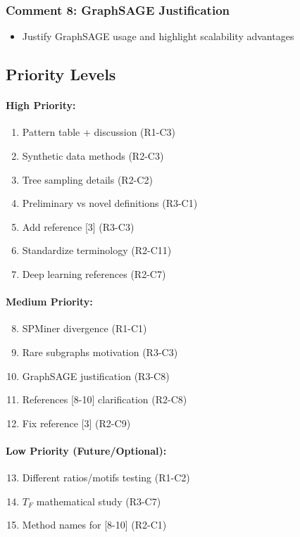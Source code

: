 \subsubsection*{Comment 8: GraphSAGE Justification}
\begin{itemize}
    \item[$\square$] Justify GraphSAGE usage and highlight scalability advantages
\end{itemize}

\subsection*{Priority Levels}

\paragraph{High Priority:}
\begin{enumerate}
    \item Pattern table + discussion (R1-C3)
    \item Synthetic data methods (R2-C3)
    \item Tree sampling details (R2-C2)
    \item Preliminary vs novel definitions (R3-C1)
    \item Add reference [3] (R3-C3)
    \item Standardize terminology (R2-C11)
    \item Deep learning references (R2-C7)
\end{enumerate}

\paragraph{Medium Priority:}
\begin{enumerate}
    \setcounter{enumi}{7}
    \item SPMiner divergence (R1-C1)
    \item Rare subgraphs motivation (R3-C3)
    \item GraphSAGE justification (R3-C8)
    \item References [8-10] clarification (R2-C8)
    \item Fix reference [3] (R2-C9)
\end{enumerate}

\paragraph{Low Priority (Future/Optional):}
\begin{enumerate}
    \setcounter{enumi}{12}
    \item Different ratios/motifs testing (R1-C2)
    \item $T_F$ mathematical study (R3-C7)
    \item Method names for [8-10] (R2-C1)
\end{enumerate}
